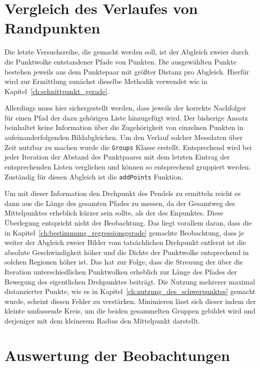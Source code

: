 \section{Vergleich des Verlaufes von Randpunkten}\label{ch:vergleich_verlauf_randpunkte}

Die letzte Versuchsreihe, die gemacht werden soll, ist der Abgleich zweier durch die Punktwolke entstandener Pfade von Punkten.
Die ausgewählten Punkte bestehen jeweils aus dem Punktepaar mit grö{\ss}ter Distanz pro Abgleich.
Hierfür wird zur Ermittlung zunächst dieselbe Methodik verwendet wie in Kapitel~\ref{ch:schnittpunkt_gerade}.

Allerdings muss hier sichergestellt werden, dass jeweils der korrekte Nachfolger für einen Pfad der dazu gehörigen Liste hinzugefügt wird.
Der bisherige Ansatz beinhaltet keine Information über die Zugehörigkeit von einzelnen Punkten in aufeinanderfolgenden Bildabgleichen.
Um den Verlauf solcher Messdaten über Zeit nutzbar zu machen wurde die \lstinline{Groups} Klasse erstellt.
Entsprechend wird bei jeder Iteration der Abstand des Punktpaares mit dem letzten Eintrag der entsprechenden Listen verglichen und können so entsprechend gruppiert werden.
Zuständig für diesen Abgleich ist die \lstinline{addPoints} Funktion.

Um mit dieser Information den Drehpunkt des Pendels zu ermitteln reicht es dann aus die Länge des gesamten Pfades zu messen, da der Gesamtweg des Mittelpunktes erheblich kürzer sein sollte, als der des Enpunktes.
Diese Überlegung entspricht nicht der Beobachtung.
Das liegt vorallem daran, dass die in Kapitel~\ref{ch:bestimmung_regressionsgerade} gemachte Beobachtung, dass je weiter der Abgleich zweier Bilder vom tatsächlichen Drehpunkt entfernt ist die absolute Geschwindigkeit höher und die Dichte der Punktwolke entsprechend in solchen Regionen höher ist.
Das hat zur Folge, dass die Streuung der über die Iteration unterschiedlichen Punktwolken erheblich zur Länge des Pfades der Bewegung des eigentlichen Drehpunktes beiträgt.
Die Nutzung mehrerer maximal distanzierter Punkte, wie es in Kapitel~\ref{ch:nutzung_des_schwerpunktes} gemacht wurde, scheint diesen Fehler zu verstärken.
Minimieren lässt sich dieser indem der kleinte umfassende Kreis, um die beiden gesammelten Gruppen gebildet wird und derjeniger mit dem kleinerem Radius den Mittelpunkt darstellt.

\section{Auswertung der Beobachtungen}

